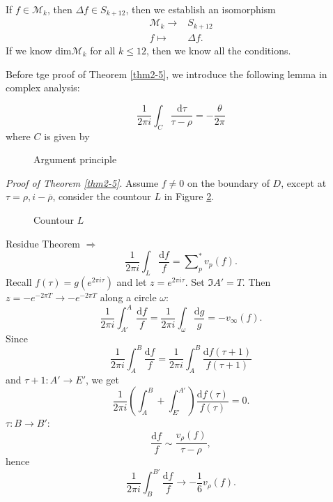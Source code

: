 If $f\in \mathcal{M}_k$, then $\Delta f\in S_{k+12}$, then we establish an isomorphism 
\begin{align*}
  \mathcal{M}_k\to &S_{k+12}\\
  f\mapsto&\Delta f
.\end{align*}
If we know $\mathrm{dim}\mathcal{M}_k$ for all $k\le 12$, then we know all the conditions.

Before tge proof of Theorem \ref{thm2-5}, we introduce the following lemma in complex analysis:
\begin{lemma}
  \begin{equation}
    \frac{1}{2\pi i}\int_C \frac{\mathrm{d}\tau}{\tau-\rho}=- \frac{\theta}{2 \pi}
  \end{equation}
  where  $C$ is given by
\begin{figure}[ht]
    \centering
    \caption{Argument principle}
    \label{fig:argument-principle}
\end{figure}
\end{lemma}
\textit{Proof of Theorem \ref{thm2-5}}. Assume $f\neq 0$ on the boundary of $D$, except at $\tau=\rho,i-\overline{\rho}$, consider the countour $L$ in Figure \ref{fig:countour}.
\begin{figure}[ht]
    \centering
    \caption{Countour $L$}
    \label{fig:countour}
\end{figure}
Residue Theorem $\Rightarrow$ 
\begin{equation}\label{2-3}
  \frac{1}{2\pi i}\int_{L} \frac{\mathrm{d}f}{f}=\sum\nolimits_{p}^{*}v_p(f).
\end{equation}
Recall $f(\tau)=g(e^{2\pi i\tau})$ and let $z=e^{2\pi i\tau}$. Set $\Im A'=T$. Then  $z=-e^{-2\pi T}\to -e^{-2\pi T}$ along a circle $\omega$:
\begin{equation}\label{2-4}
   \frac{1}{2\pi i}\int_{A'}^{A}\frac{\mathrm{d}f}{f}=\frac{1}{2\pi i}\int_{\omega} \frac{\mathrm{d}g}{g}=-v_{\infty}(f).
\end{equation}
Since 
\[
  \frac{1}{2\pi i}\int_A^{B} \frac{\mathrm{d}f}{f}=\frac{1}{2\pi i}\int_A^{B} \frac{\mathrm{d}f(\tau+1)}{f(\tau+1)}
\] 
and $\tau+1:A'\to E'$, we get 
   \begin{equation}
     \frac{1}{2\pi i}\left(\int_A^{B}+\int_{E'}^{A'}\right) \frac{\mathrm{d}f(\tau)}{f(\tau)}=0.
   \end{equation}
$\tau:B\to B'$:
 \[
   \frac{\mathrm{d}f}{f}\sim \frac{v_\rho(f)}{\tau-\rho},
\] 
hence 
\begin{equation}
  \frac{1}{2\pi i}\int_B^{B'}\frac{\mathrm{d}f}{f}\to -\frac{1}{6}v_\rho(f).
\end{equation}
